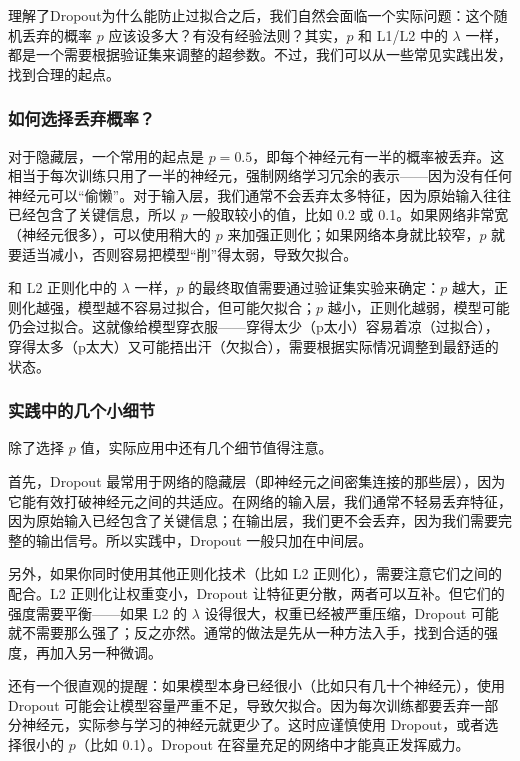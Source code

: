 \documentclass[lang=cn,zihao=-4,a4paper,fontset=windows]{beautybook}
\begin{document}
理解了Dropout为什么能防止过拟合之后，我们自然会面临一个实际问题：这个随机丢弃的概率 \(p\) 应该设多大？有没有经验法则？其实，\(p\) 和 L1/L2 中的 \(\lambda\) 一样，都是一个需要根据验证集来调整的超参数。不过，我们可以从一些常见实践出发，找到合理的起点。

\subsubsection{如何选择丢弃概率？}

对于隐藏层，一个常用的起点是 \(p = 0.5\)，即每个神经元有一半的概率被丢弃。这相当于每次训练只用了一半的神经元，强制网络学习冗余的表示——因为没有任何神经元可以“偷懒”。对于输入层，我们通常不会丢弃太多特征，因为原始输入往往已经包含了关键信息，所以 \(p\) 一般取较小的值，比如 0.2 或 0.1。如果网络非常宽（神经元很多），可以使用稍大的 \(p\) 来加强正则化；如果网络本身就比较窄，\(p\) 就要适当减小，否则容易把模型“削”得太弱，导致欠拟合。

和 L2 正则化中的 \(\lambda\) 一样，\(p\) 的最终取值需要通过验证集实验来确定：\(p\) 越大，正则化越强，模型越不容易过拟合，但可能欠拟合；\(p\) 越小，正则化越弱，模型可能仍会过拟合。这就像给模型穿衣服——穿得太少（p太小）容易着凉（过拟合），穿得太多（p太大）又可能捂出汗（欠拟合），需要根据实际情况调整到最舒适的状态。

\subsubsection*{实践中的几个小细节}

除了选择 \(p\) 值，实际应用中还有几个细节值得注意。

首先，Dropout 最常用于网络的隐藏层（即神经元之间密集连接的那些层），因为它能有效打破神经元之间的共适应。在网络的输入层，我们通常不轻易丢弃特征，因为原始输入已经包含了关键信息；在输出层，我们更不会丢弃，因为我们需要完整的输出信号。所以实践中，Dropout 一般只加在中间层。

另外，如果你同时使用其他正则化技术（比如 L2 正则化），需要注意它们之间的配合。L2 正则化让权重变小，Dropout 让特征更分散，两者可以互补。但它们的强度需要平衡——如果 L2 的 \(\lambda\) 设得很大，权重已经被严重压缩，Dropout 可能就不需要那么强了；反之亦然。通常的做法是先从一种方法入手，找到合适的强度，再加入另一种微调。

还有一个很直观的提醒：如果模型本身已经很小（比如只有几十个神经元），使用 Dropout 可能会让模型容量严重不足，导致欠拟合。因为每次训练都要丢弃一部分神经元，实际参与学习的神经元就更少了。这时应谨慎使用 Dropout，或者选择很小的 \(p\)（比如 0.1）。Dropout 在容量充足的网络中才能真正发挥威力。
\end{document}
